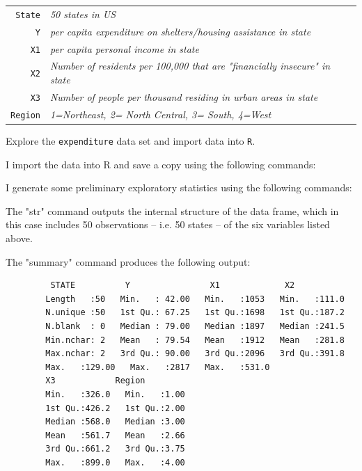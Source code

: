 \documentclass[12pt,letterpaper]{article}
\begin{document}
	
	\begin{tabular}{r|l}
		\texttt{State} &\emph{50 states in US} \\
		\texttt{Y} & \emph{per capita expenditure on shelters/housing assistance in state}\\
		\texttt{X1} &\emph{per capita personal income in state} \\
		\texttt{X2} &  \emph{Number of residents per 100,000 that are "financially insecure" in state}\\
		\texttt{X3} &  \emph{Number of people per thousand residing in urban areas in state} \\
		\texttt{Region} &  \emph{1=Northeast, 2= North Central, 3= South, 4=West} \\
	\end{tabular}
	
	\vspace{.5cm}
	\noindent Explore the \texttt{expenditure} data set and import data into \texttt{R}.
	\vspace{.5cm}
	
	I import the data into R and save a copy using the following commands:
	
	
	I generate some preliminary exploratory statistics using the following commands:
	
	
	The "str" command outputs the internal structure of the data frame, which in this case includes 50 observations -- i.e. 50 states -- of the six variables listed above. 
	
		\vspace{.5cm}
	The "summary" command produces the following output: 
	
	\begin{verbatim}
		 STATE          Y                X1             X2       
		Length   :50   Min.   : 42.00   Min.   :1053   Min.   :111.0  
		N.unique :50   1st Qu.: 67.25   1st Qu.:1698   1st Qu.:187.2  
		N.blank  : 0   Median : 79.00   Median :1897   Median :241.5  
		Min.nchar: 2   Mean   : 79.54   Mean   :1912   Mean   :281.8  
		Max.nchar: 2   3rd Qu.: 90.00   3rd Qu.:2096   3rd Qu.:391.8  
		Max.   :129.00   Max.   :2817   Max.   :531.0  
		X3            Region    
		Min.   :326.0   Min.   :1.00  
		1st Qu.:426.2   1st Qu.:2.00  
		Median :568.0   Median :3.00  
		Mean   :561.7   Mean   :2.66  
		3rd Qu.:661.2   3rd Qu.:3.75  
		Max.   :899.0   Max.   :4.00  
	\end{verbatim}
	
\end{document}
